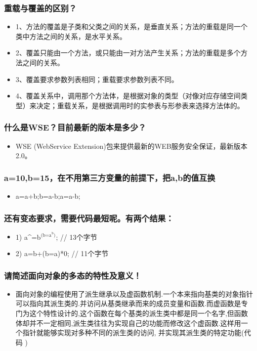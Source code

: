 \documentclass[9pt, b5paper]{article}
\begin{document}
\subsubsection{重载与覆盖的区别？}
\label{sec-1-2-127}
\begin{itemize}
\item 1、方法的覆盖是子类和父类之间的关系，是垂直关系；方法的重载是同一个类中方法之间的关系，是水平关系。
\item 2、覆盖只能由一个方法，或只能由一对方法产生关系；方法的重载是多个方法之间的关系。
\item 3、覆盖要求参数列表相同；重载要求参数列表不同。
\item 4、覆盖关系中，调用那个方法体，是根据对象的类型（对像对应存储空间类型）来决定；重载关系，是根据调用时的实参表与形参表来选择方法体的。
\end{itemize}
\subsubsection{什么是WSE？目前最新的版本是多少？}
\label{sec-1-2-128}
\begin{itemize}
\item WSE (WebService Extension)包来提供最新的WEB服务安全保证，最新版本2.0。
\end{itemize}
\subsubsection{a=10,b=15，在不用第三方变量的前提下，把a,b的值互换}
\label{sec-1-2-129}
\begin{itemize}
\item a=a+b;b=a-b;a=a-b;
\end{itemize}
\subsubsection{还有变态要求，需要代码最短呢。有两个结果：}
\label{sec-1-2-130}
\begin{itemize}
\item 1) a\^{}=b$^{\text{(b\^{}=a}^{\text{b}}\text{)}}$; // 13个字节
\item 2) a=b+(b=a)*0; // 11个字节
\end{itemize}
\subsubsection{请简述面向对象的多态的特性及意义！}
\label{sec-1-2-131}
\begin{itemize}
\item 面向对象的编程使用了派生继承以及虚函数机制.一个本来指向基类的对象指针可以指向其派生类的.并访问从基类继承而来的成员变量和函数.而虚函数是专门为这个特性设计的,这个函数在每个基类的派生类中都是同一个名字,但函数体却并不一定相同,派生类往往为实现自己的功能而修改这个虚函数.这样用一个指针就能够实现对多种不同的派生类的访问, 并实现其派生类的特定功能(代码 )
\end{itemize}
\end{document}
